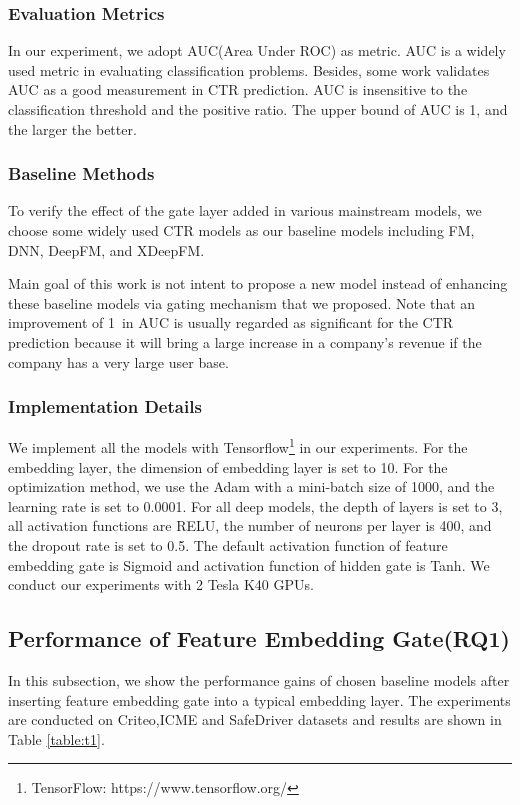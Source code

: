 \documentclass[sigconf,nonacm=true]{acmart}
\begin{document}
\subsubsection{Evaluation Metrics}
In our experiment, we adopt AUC(Area Under ROC) as metric. AUC is a widely used metric in evaluating classification problems. Besides, some work validates AUC as a good measurement in CTR prediction\cite{graepel2010web}. 
AUC is insensitive to the classification threshold and the positive ratio. 
The upper bound of AUC is 1, and the larger the better. 

\subsubsection{Baseline Methods}
To verify the effect of the gate layer added in various mainstream models, we choose some widely used CTR models as our baseline models including FM\cite{rendle2010factorization,rendle2012factorization}, DNN, DeepFM\cite{guo2017deepfm}, and XDeepFM\cite{lian2018xdeepfm}.

Main goal of this work is not intent to propose a new model instead of enhancing these baseline models via gating mechanism that we proposed.
\noindent Note that an improvement of 1\textperthousand\ in AUC is usually regarded as
significant for the CTR prediction because it will bring a large
increase in a company's revenue if the company has a very large user base.

\subsubsection{Implementation Details}
\label{sec:414}
We implement all the models with Tensorflow\footnote{TensorFlow:
  https://www.tensorflow.org/} in our experiments. For the embedding
layer, the dimension of embedding layer is set to 10. For the optimization method, we use the Adam\cite{kingma2014adam} with a mini-batch size of 1000, and the learning rate is set to 0.0001. For all deep models, the depth of layers is set to 3, all activation functions are RELU, the number of neurons per layer
is 400, and the dropout rate is set to 0.5.
The default activation function of feature embedding gate is Sigmoid and activation function of hidden gate is Tanh.    
We conduct our experiments with 2 Tesla K40 GPUs.

\subsection{Performance of Feature Embedding Gate(RQ1)}
\label{sec:s42}
In this subsection, we show the performance gains of chosen baseline models after inserting feature embedding gate into a typical embedding layer. The experiments are conducted on Criteo,ICME and SafeDriver datasets and results are shown in Table \ref{table:t1}.
  
\end{document}
